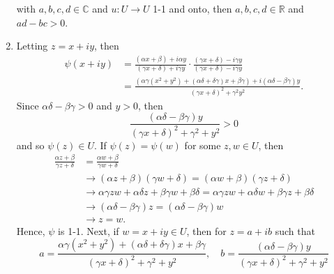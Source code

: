 \documentclass[12pt]{article}
\makeatletter
\theoremstyle{definition}
\theoremstyle{remark}
\renewenvironment{proof}[1][\proofname]{\par
  \pushQED{\qed}%
  \normalfont \topsep6\p@\@plus6\p@\relax
  \list{}{\leftmargin=0mm
          \rightmargin=4mm
          \settowidth{\itemindent}{\itshape#1}%
          \labelwidth=\itemindent
          \parsep=0pt \listparindent=\parindent 
  }
  \item[\hskip\labelsep
        \itshape
    #1\@addpunct{.}]\ignorespaces
}{%
  \popQED\endlist\@endpefalse
}
\let\oldproofname=\proofname
\renewcommand{\proofname}{\bf{\textit{\oldproofname}}}
\makeatother
\begin{document}
\begin{enumerate}[leftmargin=*]
        with $a,b,c,d\in\mathbb{C}$ and $u\colon U\rightarrow U$ 1-1 and onto, then $a,b,c,d\in\mathbb{R}$ and $ad-bc>0$.
            \begin{proof}
                Letting $z=x+iy$, then 
                    \begin{equation*}
                        \begin{split}
                            \psi(x+iy)&=\frac{(\alpha x+\beta)+i\alpha y}{(\gamma x+\delta)+i\gamma y}\cdot\frac{(\gamma x+\delta)-i\gamma y}{(\gamma x+\delta)-i\gamma y} \\
                            &=\frac{(\alpha\gamma(x^2+y^2)+(\alpha\delta+\delta\gamma)x+\beta\gamma)+i(\alpha\delta-\beta\gamma)y}{(\gamma x+\delta)^2+\gamma^2y^2}.
                        \end{split}
                    \end{equation*}
                Since $\alpha\delta-\beta\gamma>0$ and $y>0$, then 
                    \begin{equation*}
                        \frac{(\alpha\delta-\beta\gamma)y}{(\gamma x+\delta)^2+\gamma^2+y^2}>0
                    \end{equation*}
                and so $\psi(z)\in U$. If $\psi(z)=\psi(w)$ for some $z,w\in U$, then 
                    \begin{equation*}
                        \begin{split}
                            \frac{\alpha z+\beta}{\gamma z+\delta} &= \frac{\alpha w+\beta}{\gamma w+\delta} \\
                            &\rightarrow (\alpha z+\beta)(\gamma w+\delta)=(\alpha w+\beta)(\gamma z+\delta) \\
                            &\rightarrow\alpha\gamma zw+\alpha\delta z+\beta\gamma w+\beta\delta=\alpha\gamma zw+\alpha\delta w+\beta\gamma z+\beta\delta \\
                            &\rightarrow (\alpha\delta-\beta\gamma)z=(\alpha\delta-\beta\gamma)w \\
                            &\rightarrow z=w.
                        \end{split}
                    \end{equation*}
                Hence, $\psi$ is 1-1. Next, if $w=x+iy\in U$, then for $z=a+ib$ such that
                    \begin{equation*}
                        a=\frac{\alpha\gamma(x^2+y^2)+(\alpha\delta+\delta\gamma)x+\beta\gamma}{(\gamma x+\delta)^2+\gamma^2+y^2},\quad b=\frac{(\alpha\delta-\beta\gamma)y}{(\gamma x+\delta)^2+\gamma^2+y^2}

\end{equation*}
\end{proof}
\end{enumerate}
\end{document}
